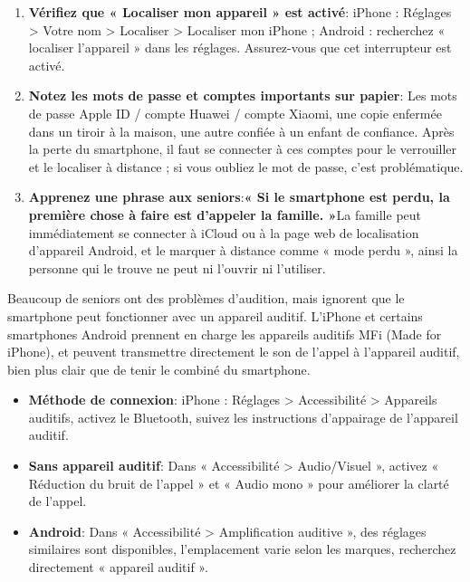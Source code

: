 \begin{enumerate}
  \item \textbf{Vérifiez que « Localiser mon appareil » est activé}: iPhone : Réglages > Votre nom > Localiser > Localiser mon iPhone ; Android : recherchez « localiser l'appareil » dans les réglages. Assurez-vous que cet interrupteur est activé.
  \item \textbf{Notez les mots de passe et comptes importants sur papier}: Les mots de passe Apple ID / compte Huawei / compte Xiaomi, une copie enfermée dans un tiroir à la maison, une autre confiée à un enfant de confiance. Après la perte du smartphone, il faut se connecter à ces comptes pour le verrouiller et le localiser à distance ; si vous oubliez le mot de passe, c'est problématique.
  \item \textbf{Apprenez une phrase aux seniors}:\textbf{« Si le smartphone est perdu, la première chose à faire est d'appeler la famille. »}La famille peut immédiatement se connecter à iCloud ou à la page web de localisation d'appareil Android, et le marquer à distance comme « mode perdu », ainsi la personne qui le trouve ne peut ni l'ouvrir ni l'utiliser.
\end{enumerate}


Beaucoup de seniors ont des problèmes d'audition, mais ignorent que le smartphone peut fonctionner avec un appareil auditif. L'iPhone et certains smartphones Android prennent en charge les appareils auditifs MFi (Made for iPhone), et peuvent transmettre directement le son de l'appel à l'appareil auditif, bien plus clair que de tenir le combiné du smartphone.

\begin{itemize}
  \item \textbf{Méthode de connexion}: iPhone : Réglages > Accessibilité > Appareils auditifs, activez le Bluetooth, suivez les instructions d'appairage de l'appareil auditif.
  \item \textbf{Sans appareil auditif}: Dans « Accessibilité > Audio/Visuel », activez « Réduction du bruit de l'appel » et « Audio mono » pour améliorer la clarté de l'appel.
  \item \textbf{Android}: Dans « Accessibilité > Amplification auditive », des réglages similaires sont disponibles, l'emplacement varie selon les marques, recherchez directement « appareil auditif ».
\end{itemize}

